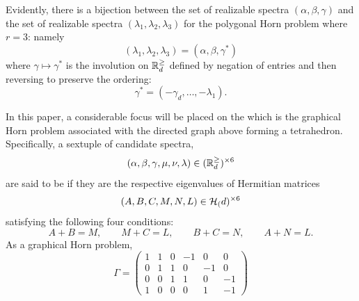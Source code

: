 \documentclass[notitlepage, 10pt]{article}
\begin{document}
\begin{rem}
    Evidently, there is a bijection between the set of realizable spectra $(\alpha, \beta, \gamma)$ and the set of realizable spectra $(\lambda_1, \lambda_2, \lambda_3)$ for the polygonal Horn problem where $r=3$: namely
    \begin{equation}
        (\lambda_1, \lambda_2, \lambda_3) = (\alpha, \beta, \gamma^{*})
    \end{equation}
    where $\gamma \mapsto \gamma^{*}$ is the involution on $\mathbb R^{\geq}_{d}$ defined by negation of entries and then reversing to preserve the ordering:
    \begin{equation}
        \gamma^{*} = (-\gamma_d, \ldots, -\lambda_1).
    \end{equation}
\end{rem}

\begin{exam}
    In this paper, a considerable focus will be placed on the  which is the graphical Horn problem associated with the directed graph above forming a tetrahedron.
    Specifically, a sextuple of candidate spectra,
    \begin{equation}
        (\alpha, \beta, \gamma, \mu, \nu, \lambda) \in (\mathbb R^{\geq}_{d})^{\times 6}
    \end{equation}
    are said to be  if they are the respective eigenvalues of Hermitian matrices 
    \begin{equation}
        (A,B,C,M,N,L) \in \mathcal H_{(}d)^{\times 6}
    \end{equation}
    satisfying the following four conditions:
    \begin{equation}
        A + B = M, \qquad M + C = L, \qquad B+C = N, \qquad A + N = L.
    \end{equation}
    As a graphical Horn problem,
    \begin{equation}
        \Gamma = 
        \begin{pmatrix} 
            1 & 1 & 0 & -1 & 0 & 0 \\
            0 & 1 & 1 & 0 & -1 & 0 \\
            0 & 0 & 1 & 1 & 0 & -1 \\
            1 & 0 & 0 & 0 & 1 & -1
        \end{pmatrix}
    \end{equation}
\end{exam}
\end{document}
